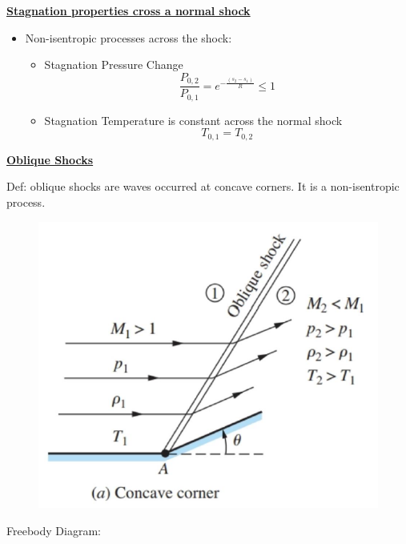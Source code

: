\large \textbf{\underline{Stagnation properties cross a normal shock}}

\begin{itemize}
    \item Non-isentropic processes across the shock:
    \begin{itemize}
        \item {\color{blue}Stagnation Pressure Change}
        \begin{equation*}
            \frac{P_{0,2}}{P_{0,1}} = e^{-\frac{(s_2-s_1)}{R}} \leq 1
        \end{equation*}
        \item {\color{blue}Stagnation Temperature} is constant across the normal shock
        \begin{equation*}
            T_{0,1} = T_{0,2}
        \end{equation*}
    \end{itemize}
\end{itemize}

\Large \textbf{{\color{red}\underline{Oblique Shocks}}}

Def: oblique shocks are waves occurred at concave corners. It is a {\color{red}non-isentropic} process.
\begin{figure}[H]
    \centering
    \includegraphics[width=1.0\linewidth]{images/oblique_shock_concave.png}
\end{figure}

Freebody Diagram:

